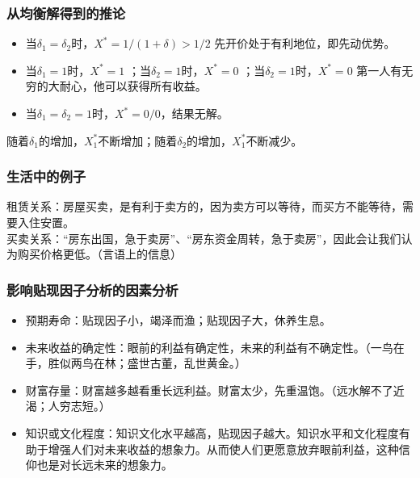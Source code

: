 \documentclass[12pt, a4paper]{article}
\begin{document}
\begin{CJK*}{UTF8}{gbsn}
\begin{flushleft}
        \subsubsection{从均衡解得到的推论}
        \begin{itemize}
            \item 当$\delta_1=\delta_2$时，$X^*=1/(1+\delta)>1/2$ 先开价处于有利地位，即先动优势。
            \item 当$\delta_1=1$时，$X^*=1$ ；当$\delta_2=1$时，$X^*=0$ ；当$\delta_2=1$时，$X^*=0$ 第一人有无穷的大耐心，他可以获得所有收益。
            \item 当$\delta_1=\delta_2=1$时，$X^*=0/0$，结果无解。
        \end{itemize}
        随着$\delta_1$的增加，$X_1^*$不断增加；随着$\delta_2$的增加，$X_1^*$不断减少。

        \subsubsection{生活中的例子}
        租赁关系：房屋买卖，是有利于卖方的，因为卖方可以等待，而买方不能等待，需要入住安置。\\
        买卖关系：“房东出国，急于卖房”、“房东资金周转，急于卖房”，因此会让我们认为购买价格更低。（言语上的信息）

        \subsubsection{影响贴现因子分析的因素分析}
        \begin{itemize}
            \item 预期寿命：贴现因子小，竭泽而渔；贴现因子大，休养生息。
            \item 未来收益的确定性：眼前的利益有确定性，未来的利益有不确定性。（一鸟在手，胜似两鸟在林；盛世古董，乱世黄金。）
            \item 财富存量：财富越多越看重长远利益。财富太少，先重温饱。（远水解不了近渴；人穷志短。）
            \item 知识或文化程度：知识文化水平越高，贴现因子越大。知识水平和文化程度有助于增强人们对未来收益的想象力。从而使人们更愿意放弃眼前利益，这种信仰也是对长远未来的想象力。
        \end{itemize}

\end{flushleft}
\end{CJK*}
\end{document}
